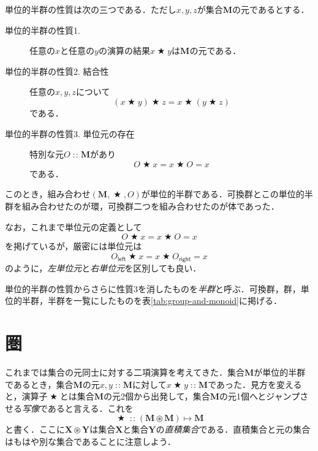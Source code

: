 \documentclass[twocolumn]{jsbook}
\newcommand{\keyword}[1]{{\emph{#1}}}
\newcommand{\mathVarKeyword}[1]{\mathsf{#1}}
\DeclareMathOperator{\mathAnyBinaryOperator}{\bigstar}
\DeclareMathOperator{\mathIn}{:\!:}
\DeclareMathOperator{\mathMapsTo}{\mapsto}
\DeclareMathOperator{\mathSetTimes}{\circledast}
\newcommand{\mathLeft}{\mathVarKeyword{left}}
\newcommand{\mathRight}{\mathVarKeyword{right}}
\newcommand{\mathSet}[1]{\mathbf{#1}} %
\newcommand{\mathMorph}[2]{#1\mathMapsTo#2}
\newcommand{\mathMonoid}[3]{(#1,#2,#3)}
\begin{document}
単位的半群の性質は次の三つである．ただし$x,y,z$が集合$\mathSet{M}$の元であるとする．
\begin{description}
\item[単位的半群の性質1.] 任意の$x$と任意の$y$の演算の結果$x\mathAnyBinaryOperator y$は$\mathSet{M}$の元である．
\item[単位的半群の性質2. 結合性] 任意の$x,y,z$について
\begin{equation}
(x\mathAnyBinaryOperator y)\mathAnyBinaryOperator z=x\mathAnyBinaryOperator(y\mathAnyBinaryOperator z)
\end{equation}
である．
\item[単位的半群の性質3. 単位元の存在] 特別な元$O\mathIn\mathSet{M}$があり
\begin{equation}
O\mathAnyBinaryOperator x=x\mathAnyBinaryOperator O=x
\end{equation}
である．
\end{description}
このとき，組み合わせ$\mathMonoid{\mathSet{M}}{\mathAnyBinaryOperator}{O}$が単位的半群である．可換群とこの単位的半群を組み合わせたのが環，可換群二つを組み合わせたのが体であった．

なお，これまで単位元の定義として
\begin{equation*}
O\mathAnyBinaryOperator x=x\mathAnyBinaryOperator O=x
\end{equation*}
を掲げているが，厳密には単位元は
\begin{equation}
O_\mathLeft\mathAnyBinaryOperator x=x\mathAnyBinaryOperator O_\mathRight=x
\end{equation}
のように，\keyword{左単位元}と\keyword{右単位元}を区別しても良い．

単位的半群の性質からさらに性質3を消したものを\keyword{半群}と呼ぶ．可換群，群，単位的半群，半群を一覧にしたものを表\ref{tab:group-and-monoid}に掲げる．

\section{圏}

これまでは集合の元同士に対する二項演算を考えてきた．集合$\mathSet{M}$が単位的半群であるとき，集合$\mathSet{M}$の元$x,y\mathIn\mathSet{M}$に対して$x\mathAnyBinaryOperator y\mathIn\mathSet{M}$であった．見方を変えると，演算子$\mathAnyBinaryOperator$とは集合$\mathSet{M}$の元2個から出発して，集合$\mathSet{M}$の元1個へとジャンプさせる\keyword{写像}であると言える．これを
\begin{equation}
\mathAnyBinaryOperator\mathIn{}\mathMorph{(\mathSet{M}\mathSetTimes\mathSet{M})}{\mathSet{M}}
\end{equation}
と書く．ここに$\mathSet{X}\mathSetTimes\mathSet{Y}$は集合$\mathSet{X}$と集合$\mathSet{Y}$の\keyword{直積集合}である．直積集合と元の集合はもはや別な集合であることに注意しよう．
\end{document}
